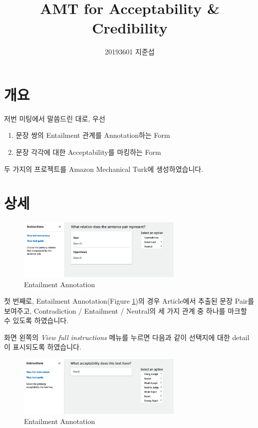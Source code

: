 \documentclass[11pt]{article}
\author{20193601 지준섭}
\title{AMT for Acceptability \& Credibility}
\begin{document}
\maketitle

\section{개요}

저번 미팅에서 말씀드린 대로, 우선
\begin{enumerate}
  \item 문장 쌍의 Entailment 관계를 Annotation하는 Form
  \item 문장 각각에 대한 Acceptability를 마킹하는 Form
\end{enumerate}
두 가지의 프로젝트를 Amazon Mechanical Turk에 생성하였습니다.

\section{상세}
\begin{figure}[!htbp]
  \centering
  \includegraphics[width=300px]{images/amt-02.png}
  \caption{Entailment Annotation}
  \label{fig:entailann}
\end{figure}
첫 번째로, Entailment Annotation(Figure \ref{fig:entailann})의 경우
Article에서 추출된 문장 Pair를 보여주고, Contradiction / Entailment / Neutral의
세 가지 관계 중 하나를 마크할 수 있도록 하였습니다.

화면 왼쪽의 \textit{View full instructions} 메뉴를 누르면
다음과 같이 선택지에 대한 detail이 표시되도록 하였습니다.

\noindent
\begin{center}
\end{center}

\begin{figure}[!htbp]
  \centering
  \includegraphics[width=300px]{images/amt-01.png}
  \caption{Entailment Annotation}
  \label{fig:acceptann}
\end{figure}
\end{document}
